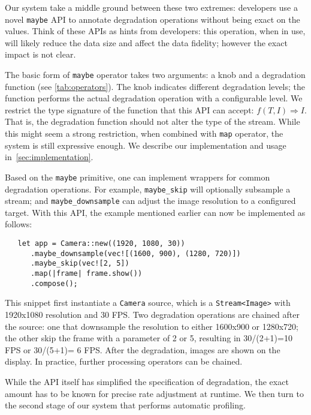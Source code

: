 Our system take a middle ground between these two extremes: developers use a
novel \texttt{maybe} API to annotate degradation operations without being exact
on the values. Think of these APIs as hints from developers: this operation,
when in use, will likely reduce the data size and affect the data fidelity;
however the exact impact is not clear.

The basic form of \texttt{maybe} operator takes two arguments: a knob and a
degradation function (see \autoref{tab:operators}). The knob indicates different
degradation levels; the function performs the actual degradation operation with
a configurable level. We restrict the type signature of the function that this
API can accept: $f(T, I) \Rightarrow I$. That is, the degradation function
should not alter the type of the stream. While this might seem a strong
restriction, when combined with \texttt{map} operator, the system is still
expressive enough. We describe our implementation and usage
in~\autoref{sec:implementation}.

\begin{sloppypar}
  Based on the \texttt{maybe} primitive, one can implement wrappers for common
  degradation operations. For example, \texttt{maybe\_skip} will optionally
  subsample a stream; and \texttt{maybe\_downsample} can adjust the image
  resolution to a configured target. With this API, the example mentioned
  earlier can now be implemented as follows:
\end{sloppypar}

\begin{lstlisting}
   let app = Camera::new((1920, 1080, 30))
      .maybe_downsample(vec![(1600, 900), (1280, 720)])
      .maybe_skip(vec![2, 5])
      .map(|frame| frame.show())
      .compose();
\end{lstlisting}

This snippet first instantiate a \texttt{Camera} source, which is a
\texttt{Stream<Image>} with 1920x1080 resolution and 30 FPS. Two degradation
operations are chained after the source: one that downsample the resolution to
either 1600x900 or 1280x720; the other skip the frame with a parameter of 2 or
5, resulting in 30/(2+1)=10 FPS or 30/(5+1)= 6 FPS. After the degradation,
images are shown on the display. In practice, further processing operators can
be chained.

While the API itself has simplified the specification of degradation, the exact
amount has to be known for precise rate adjustment at runtime. We then turn to
the second stage of our system that performs automatic profiling.


